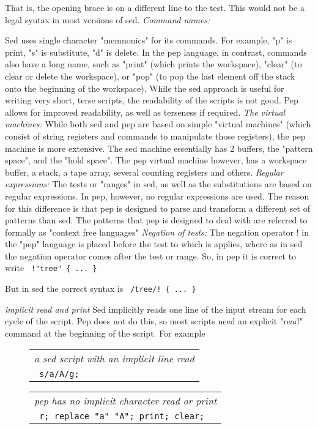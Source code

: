 \documentclass[a4paper,12pt]{article}
\begin{document}
      That is, the opening brace is on a different line to the
      test. This would not be a legal syntax in most versions of sed.
 \emph{ Command names: }

      Sed uses single character "memnonics" for its commands. For example, "p"
      is print, "s" is substitute, "d" is delete. In the pep language, in
      contrast, commands also have a long name, such as "print" (which prints
      the workspace), "clear" (to clear or delete the workspace), or "pop" (to
      pop the last element off the stack onto the beginning of the workspace).
      While the sed approach is useful for writing very short, terse scripts,
      the readability of the scripts is not good. Pep allows for improved
      readability, as well as terseness if required.
 \emph{ The virtual machines: }
      While both sed and pep are based on simple "virtual machines" (which
      consist of string registers and commands to manipulate those registers),
      the pep machine is more extensive. The sed machine essentially has 2
      buffers, the "pattern space", and the "hold space". The pep virtual
      machine however, has a workspace buffer, a stack, a tape array, several
      counting registers and others.
 \emph{ Regular expressions: }
      The tests or "ranges" in sed, as well as the substitutions are based
      on regular expressions. In pep, however, no regular expressions are
      used. The reason for this difference is that pep is designed to
      parse and transform a different set of patterns than sed. The patterns
      that pep is designed to deal with are referred to formally as
      "context free languages"
 \emph{ Negation of tests: }
      The negation operator ! in the "pep" language is placed
      before the test to which is applies, where as in sed the
      negation operator comes after the test or range. So,
      in pep it is correct to write 
 \verb| !"tree" { ... } |

      But in sed the correct syntax is 
 \verb| /tree/! { ... } |

 \emph{ implicit read and print }
      Sed implicitly reads one line of the input stream for each cycle of the
      script. Pep does not do this, so most scripts need an explicit "read"
      command at the beginning of the script. For example
 \begin{figure}
 \begin{tabular}{ l }
 \emph{ a sed script with an implicit line read } \\ 
 \verb| s/a/A/g; |
 \end{tabular} 
 \end{figure}
 \begin{figure}
 \begin{tabular}{ l }
 \emph{ pep has no implicit character read or print } \\ 
 \verb| r; replace "a" "A"; print; clear; |
 \end{tabular} 
 \end{figure}
\end{document}
